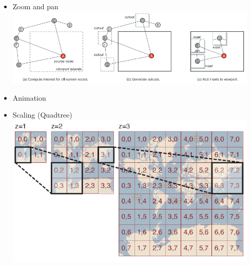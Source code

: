 \begin{itemize}
	\item Zoom and pan\\
		\includegraphics[width=0.95\textwidth]{Pics/07-06-ZoomAndPan.png}
	\item Animation
	\item Scaling (Quadtree)\\
		\includegraphics[width=0.95\textwidth]{Pics/07-06-Quadtree.png}
\end{itemize}